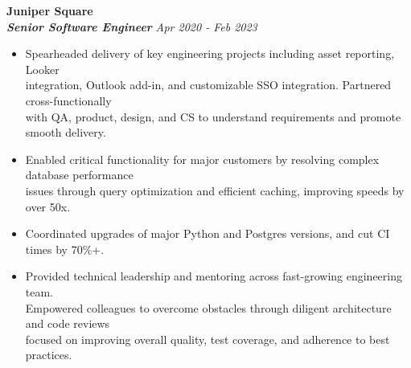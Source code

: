 \documentclass[]{resume}
\newcommand\tab[1][.5cm]{\hspace*{#1}}
\begin{document}
\begin{resume}
\vspace{0.9mm}
\textbf{\large Juniper Square}\\
\tab \textbf{\textit{Senior Software Engineer}} \hfill \textit{Apr 2020 - Feb 2023}
\begin{itemize}
    \item
    Spearheaded delivery of key engineering projects including asset reporting, Looker \\
    integration, Outlook add-in, and customizable SSO integration. Partnered cross-functionally \\
    with QA, product, design, and CS to understand requirements and promote smooth delivery.
    \item
    Enabled critical functionality for major customers by resolving complex database performance \\
    issues through query optimization and efficient caching, improving speeds by over 50x.
    \item
    Coordinated upgrades of major Python and Postgres versions, and cut CI times by 70\%+.
    \item
    Provided technical leadership and mentoring across fast-growing engineering team. \\
    Empowered colleagues to overcome obstacles through diligent architecture and code reviews \\
    focused on improving overall quality, test coverage, and adherence to best practices.
\end{itemize}


\end{resume}
\end{document}
